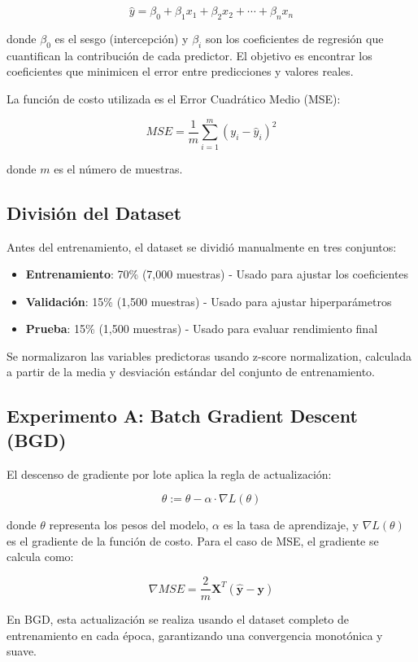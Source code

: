 \documentclass[conference]{IEEEtran}
\begin{document}
$$\hat{y} = \beta_0 + \beta_1 x_1 + \beta_2 x_2 + \cdots + \beta_n x_n$$

donde $\beta_0$ es el sesgo (intercepción) y $\beta_i$ son los coeficientes de regresión que cuantifican la contribución de cada predictor. El objetivo es encontrar los coeficientes que minimicen el error entre predicciones y valores reales.

La función de costo utilizada es el Error Cuadrático Medio (MSE):

$$MSE = \frac{1}{m} \sum_{i=1}^{m} (y_i - \hat{y}_i)^2$$

donde $m$ es el número de muestras.

\subsection{División del Dataset}

Antes del entrenamiento, el dataset se dividió manualmente en tres conjuntos:

\begin{itemize}
\item \textbf{Entrenamiento}: 70\% (7,000 muestras) - Usado para ajustar los coeficientes
\item \textbf{Validación}: 15\% (1,500 muestras) - Usado para ajustar hiperparámetros
\item \textbf{Prueba}: 15\% (1,500 muestras) - Usado para evaluar rendimiento final
\end{itemize}

Se normalizaron las variables predictoras usando z-score normalization, calculada a partir de la media y desviación estándar del conjunto de entrenamiento.

\subsection{Experimento A: Batch Gradient Descent (BGD)}

El descenso de gradiente por lote aplica la regla de actualización:

$$\theta := \theta - \alpha \cdot \nabla L(\theta)$$

donde $\theta$ representa los pesos del modelo, $\alpha$ es la tasa de aprendizaje, y $\nabla L(\theta)$ es el gradiente de la función de costo. Para el caso de MSE, el gradiente se calcula como:

$$\nabla MSE = \frac{2}{m} \mathbf{X}^T (\hat{\mathbf{y}} - \mathbf{y})$$

En BGD, esta actualización se realiza usando el dataset completo de entrenamiento en cada época, garantizando una convergencia monotónica y suave.
\end{document}
